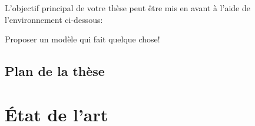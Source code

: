 \documentclass[french]{spimutbmphdthesis}
\begin{document}
L'objectif principal de votre thèse peut être mis en avant à l'aide de l'environnement ci-dessous:

\begin{emphbox}
	Proposer un modèle qui fait quelque chose!
\end{emphbox}

\section{Plan de la thèse}

\chapter{\'Etat de l'art}

%
%
%
%
%
%
\end{document}
